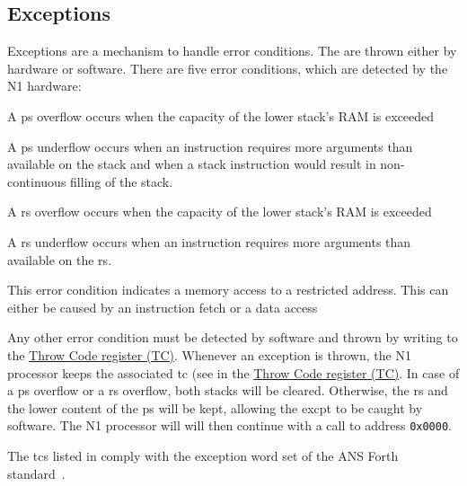 \subsection{Exceptions}
\label{reset:excpt}
Exceptions are a mechanism to handle error conditions. The are thrown either by hardware or software.
There are five error conditions, which are detected by the N1 hardware:
\begin{description}[style=nextline]
\item[\Gls{ps} overflow]
  A \gls{ps} overflow occurs when the capacity of the lower stack's RAM is exceeded
\item[\Gls{rs} stack underflow]
  A \gls{ps} underflow occurs when an instruction requires more arguments than
  available on the \gls{stack} and when a stack instruction would result in non-continuous filling
  of the stack.
\item[\Gls{rs} overflow]
  A \gls{rs} overflow occurs when the capacity of the lower stack's RAM is exceeded
\item[\Gls{rs} underflow]
  A \gls{rs} underflow occurs when an instruction requires more arguments than
  available on the \gls{rs}.
\item[Address out of range]
  This error condition indicates a memory access to a restricted address. This can either
  be caused by an instruction fetch or a data access
\end{description}

Any other error condition must be detected by software and thrown by writing to the
\hyperref[opcodes:freg:tc]{Throw Code register (TC)}.
Whenever an exception is thrown, the N1 processor keeps the associated \gls{tc}
(see  in the \hyperref[opcodes:freg:tc]{Throw Code register (TC)}.
In case of a \gls{ps} overflow or a \gls{rs} overflow, both stacks will be cleared.
Otherwise, the \gls{rs} and the lower content of the \gls{ps} will be kept,
allowing the \gls{excpt} to be caught by software.
The N1 processor will will then continue with a call to address \texttt{0x0000}.

The \glspl{tc} listed in  comply with the exception word set of
the ANS Forth standard~\cite{dpans94}.

